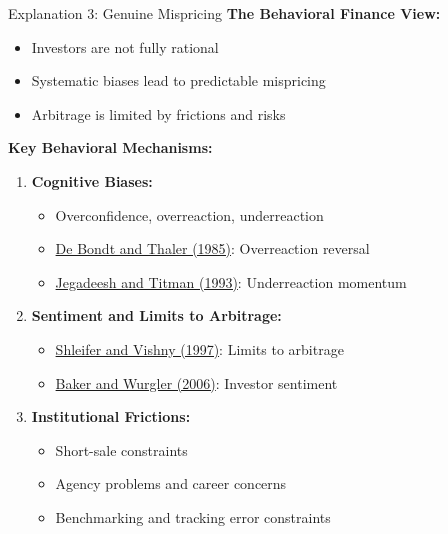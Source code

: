 \documentclass{beamer}
\begin{document}
\begin{frame}{Explanation 3: Genuine Mispricing}
    \textbf{The Behavioral Finance View:}
    \begin{itemize}
        \item Investors are not fully rational
        \item Systematic biases lead to predictable mispricing
        \item Arbitrage is limited by frictions and risks
    \end{itemize}
    
    \vspace{0.3cm}
    \textbf{Key Behavioral Mechanisms:}
    \begin{enumerate}
        \item \textbf{Cognitive Biases:}
        \begin{itemize}
            \item Overconfidence, overreaction, underreaction
            \item \textcolor{blue}{\href{https://onlinelibrary.wiley.com/doi/abs/10.1111/j.1540-6261.1985.tb05004.x}{De Bondt and Thaler (1985)}}: Overreaction reversal
            \item \textcolor{blue}{\href{https://onlinelibrary.wiley.com/doi/10.1111/j.1540-6261.1993.tb04702.x}{Jegadeesh and Titman (1993)}}: Underreaction momentum
        \end{itemize}
        \item \textbf{Sentiment and Limits to Arbitrage:}
        \begin{itemize}
            \item \textcolor{blue}{\href{https://doi.org/10.1111/j.1540-6261.1997.tb03807.x}{Shleifer and Vishny (1997)}}: Limits to arbitrage
            \item \textcolor{blue}{\href{https://doi.org/10.1111/j.1540-6261.2006.00885.x}{Baker and Wurgler (2006)}}: Investor sentiment
        \end{itemize}
        \item \textbf{Institutional Frictions:}
        \begin{itemize}
            \item Short-sale constraints
            \item Agency problems and career concerns
            \item Benchmarking and tracking error constraints
        \end{itemize}
    \end{enumerate}
\end{frame}
\end{document}
